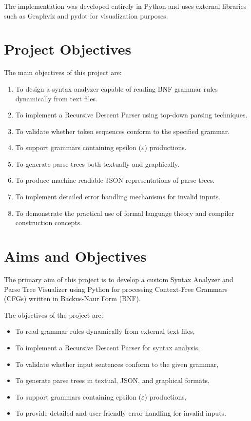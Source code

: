 \documentclass[12pt,a4paper]{article}
\begin{document}
The implementation was developed entirely in Python and uses external libraries such as Graphviz and pydot for visualization purposes.

\section{Project Objectives}

The main objectives of this project are:

\begin{enumerate}
    \item To design a syntax analyzer capable of reading BNF grammar rules dynamically from text files.
    
    \item To implement a Recursive Descent Parser using top-down parsing techniques.
    
    \item To validate whether token sequences conform to the specified grammar.
    
    \item To support grammars containing epsilon ($\varepsilon$) productions.
    
    \item To generate parse trees both textually and graphically.
    
    \item To produce machine-readable JSON representations of parse trees.
    
    \item To implement detailed error handling mechanisms for invalid inputs.
    
    \item To demonstrate the practical use of formal language theory and compiler construction concepts.
\end{enumerate}
	\section{Aims and Objectives}
	The primary aim of this project is to develop a custom Syntax Analyzer and Parse Tree Visualizer using Python for processing Context-Free Grammars (CFGs) written in Backus-Naur Form (BNF). 

The objectives of the project are:
\begin{itemize}
    \item To read grammar rules dynamically from external text files,
    \item To implement a Recursive Descent Parser for syntax analysis,
    \item To validate whether input sentences conform to the given grammar,
    \item To generate parse trees in textual, JSON, and graphical formats,
    \item To support grammars containing epsilon ($\varepsilon$) productions,
    \item To provide detailed and user-friendly error handling for invalid inputs.
\end{itemize}
	
\end{document}
